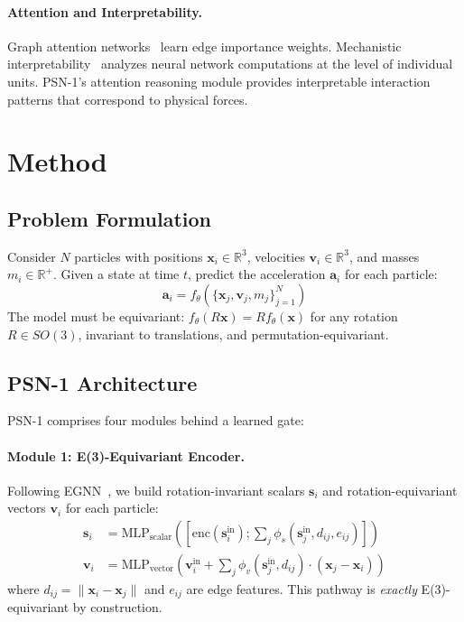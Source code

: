 \documentclass[10pt,twocolumn]{article}
\begin{document}
\paragraph{Attention and Interpretability.}
Graph attention networks~\cite{velickovic2018graph} learn edge importance weights. Mechanistic interpretability~\cite{olah2020zoom} analyzes neural network computations at the level of individual units. PSN-1's attention reasoning module provides interpretable interaction patterns that correspond to physical forces.

\section{Method}
\label{sec:method}

\subsection{Problem Formulation}
Consider $N$ particles with positions $\mathbf{x}_i \in \mathbb{R}^3$, velocities $\mathbf{v}_i \in \mathbb{R}^3$, and masses $m_i \in \mathbb{R}^+$. Given a state at time $t$, predict the acceleration $\mathbf{a}_i$ for each particle:
\begin{equation}
    \mathbf{a}_i = f_\theta(\{\mathbf{x}_j, \mathbf{v}_j, m_j\}_{j=1}^N)
\end{equation}
The model must be equivariant: $f_\theta(R\mathbf{x}) = Rf_\theta(\mathbf{x})$ for any rotation $R \in SO(3)$, invariant to translations, and permutation-equivariant.

\subsection{PSN-1 Architecture}
\label{sec:arch}

PSN-1 comprises four modules behind a learned gate:

\paragraph{Module 1: E(3)-Equivariant Encoder.}
Following EGNN~\cite{satorras2021egnn}, we build rotation-invariant scalars $\mathbf{s}_i$ and rotation-equivariant vectors $\mathbf{v}_i$ for each particle:
\begin{align}
    \mathbf{s}_i &= \text{MLP}_{\text{scalar}}([\text{enc}(\mathbf{s}_i^{\text{in}}); \sum_j \phi_s(\mathbf{s}_j^{\text{in}}, d_{ij}, e_{ij})]) \\
    \mathbf{v}_i &= \text{MLP}_{\text{vector}}(\mathbf{v}_i^{\text{in}} + \sum_j \phi_v(\mathbf{s}_j^{\text{in}}, d_{ij}) \cdot (\mathbf{x}_j - \mathbf{x}_i))
\end{align}
where $d_{ij} = \|\mathbf{x}_i - \mathbf{x}_j\|$ and $e_{ij}$ are edge features. This pathway is \emph{exactly} E(3)-equivariant by construction.
\end{document}
